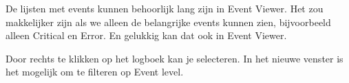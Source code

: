 De lijsten met events kunnen behoorlijk lang zijn in Event Viewer. Het zou makkelijker zijn als we alleen de belangrijke events kunnen zien, bijvoorbeeld alleen Critical en Error. En gelukkig kan dat ook in Event Viewer.

\begin{minipage}[t]{\linewidth}
\raggedright
{}
\end{minipage}

Door rechts te klikken op het logboek kan je  selecteren. In het nieuwe venster is het mogelijk om te filteren op Event level.

